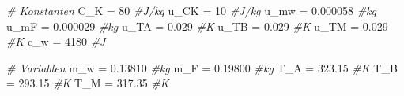 \documentclass[
  9pt,
]{article}
\newenvironment{Shaded}{\begin{snugshade}}{\end{snugshade}}
\newcommand{\CommentTok}[1]{\textcolor[rgb]{0.56,0.35,0.01}{\textit{#1}}}
\newcommand{\DecValTok}[1]{\textcolor[rgb]{0.00,0.00,0.81}{#1}}
\newcommand{\FloatTok}[1]{\textcolor[rgb]{0.00,0.00,0.81}{#1}}
\newcommand{\NormalTok}[1]{#1}
\newcommand{\OtherTok}[1]{\textcolor[rgb]{0.56,0.35,0.01}{#1}}
\begin{document}
\begin{Shaded}
\begin{Highlighting}[]
\CommentTok{\# Konstanten}
\NormalTok{C\_K }\OtherTok{=} \DecValTok{80} \CommentTok{\#J/kg}
\NormalTok{u\_CK }\OtherTok{=} \DecValTok{10} \CommentTok{\#J/kg}
\NormalTok{u\_mw }\OtherTok{=} \FloatTok{0.000058} \CommentTok{\#kg}
\NormalTok{u\_mF }\OtherTok{=} \FloatTok{0.000029} \CommentTok{\#kg}
\NormalTok{u\_TA }\OtherTok{=} \FloatTok{0.029} \CommentTok{\#K}
\NormalTok{u\_TB }\OtherTok{=} \FloatTok{0.029} \CommentTok{\#K}
\NormalTok{u\_TM }\OtherTok{=} \FloatTok{0.029} \CommentTok{\#K}
\NormalTok{c\_w }\OtherTok{=} \DecValTok{4180} \CommentTok{\#J}

\CommentTok{\# Variablen}
\NormalTok{m\_w }\OtherTok{=} \FloatTok{0.13810} \CommentTok{\#kg}
\NormalTok{m\_F }\OtherTok{=} \FloatTok{0.19800} \CommentTok{\#kg}
\NormalTok{T\_A }\OtherTok{=} \FloatTok{323.15} \CommentTok{\#K}
\NormalTok{T\_B }\OtherTok{=} \FloatTok{293.15} \CommentTok{\#K}
\NormalTok{T\_M }\OtherTok{=} \FloatTok{317.35} \CommentTok{\#K}


\end{Highlighting}
\end{Shaded}
\end{document}
